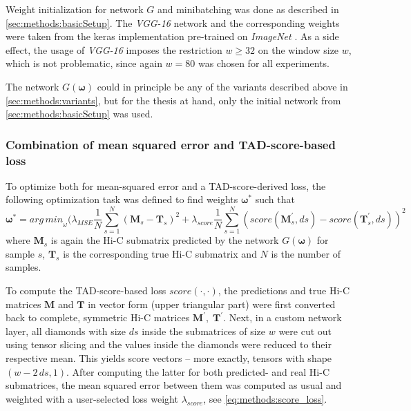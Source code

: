 Weight initialization for network $G$ and minibatching was done as described in \cref{sec:methods:basicSetup}.
The \emph{VGG-16} network and the corresponding weights were taken from the keras \cite{Chollet2015} implementation pre-trained on \emph{ImageNet} \cite{deng2009}.
As a side effect, the usage of \emph{VGG-16} imposes the restriction $w \geq 32$ on the window size $w$, which is not problematic, since again $w=80$ was chosen for all experiments.

The network $G(\bm{\omega})$ could in principle be any of the variants described above in \cref{sec:methods:variants},
but for the thesis at hand, only the initial network from \cref{sec:methods:basicSetup} was used.

\subsubsection{Combination of mean squared error and TAD-score-based loss} \label{sec:methods:score_loss}
To optimize both for mean-squared error and a TAD-score-derived loss, the following optimization task was defined to find weights $\bm{\omega}^*$ such that
\begin{equation}
 \bm{\omega}^* = \mathit{arg\,min}_\omega (  \lambda_\mathit{MSE} \frac{1}{N} \sum_{s=1}^N (\mathbf{M}_s - \mathbf{T}_s)^2
                                                    + \lambda_\mathit{score} \frac{1}{N} \sum_{s=1}^N (\mathit{score}(\mathbf{M}^\prime_s,ds) - \mathit{score}(\mathbf{T}^\prime_s,ds))^2 \label{eq:methods:score_loss}
\end{equation}
where $\mathbf{M}_s$ is again the Hi-C submatrix predicted by the network $G(\bm{\omega})$ for sample $s$, $\mathbf{T}_s$ is the corresponding true Hi-C submatrix
and $N$ is the number of samples.

To compute the TAD-score-based loss $\mathit{score}(\cdot,\cdot)$, the predictions and true Hi-C matrices $\mathbf{M}$ and $\mathbf{T}$ in vector form (upper triangular part)
were first converted back to complete, symmetric Hi-C matrices $\mathbf{M}^\prime,\; \mathbf{T}^\prime$. 
Next, in a custom network layer, all diamonds with size $ds$ inside the submatrices of size $w$ were cut out using tensor slicing and the values inside the diamonds were reduced to their respective mean.
This yields score vectors -- more exactly, tensors with shape $(w - 2\,ds, 1)$.
After computing the latter for both predicted- and real Hi-C submatrices, the mean squared error between them was computed as usual and weighted with 
a user-selected loss weight $\lambda_\mathit{score}$, see \cref{eq:methods:score_loss}.

